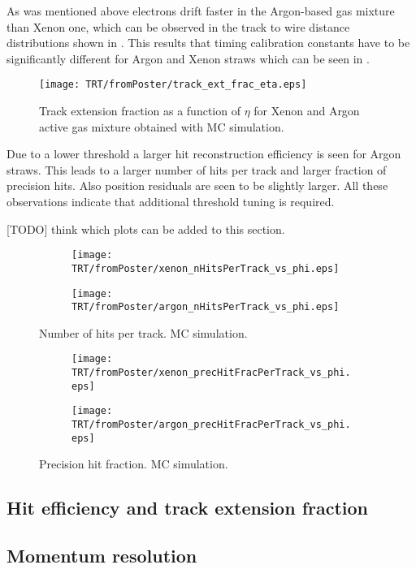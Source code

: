 As was mentioned above electrons drift faster in the Argon-based gas mixture than Xenon one, which can be observed in the track to wire distance
distributions shown in . 
This results that timing calibration constants have to be significantly different 
for Argon and Xenon straws which can be seen in . 


\begin{figure}
\begin{center}
 \texttt{[image: TRT/fromPoster/track\_ext\_frac\_eta.eps]}
\caption{Track extension fraction as a function of $\eta$ for Xenon and Argon active gas mixture obtained with MC simulation.}
\label{fig:meanFreePath}
\end{center}
\end{figure}



Due to a lower threshold a larger hit reconstruction efficiency is seen for Argon straws. This leads to a
larger number of hits per track and larger fraction of precision hits. Also position residuals are seen to be 
slightly larger. All these observations indicate that additional threshold tuning is required.

[TODO] think which plots can be added to this section.

\begin{figure}

\begin{subfigure}{.5\textwidth}
  \centering
  \texttt{[image: TRT/fromPoster/xenon\_nHitsPerTrack\_vs\_phi.eps]}
\end{subfigure}%
\begin{subfigure}{.5\textwidth}
  \centering
  \texttt{[image: TRT/fromPoster/argon\_nHitsPerTrack\_vs\_phi.eps]}
\end{subfigure}

\caption{Number of hits per track. MC simulation.}
  \label{fig:nPrecHitsPerTrack}
\end{figure}


\begin{figure}

\begin{subfigure}{.5\textwidth}
  \centering
  \texttt{[image: TRT/fromPoster/xenon\_precHitFracPerTrack\_vs\_phi.eps]}
\end{subfigure}%
\begin{subfigure}{.5\textwidth}
  \centering
  \texttt{[image: TRT/fromPoster/argon\_precHitFracPerTrack\_vs\_phi.eps]}
\end{subfigure}

\caption{Precision hit fraction. MC simulation.}
  \label{fig:precHitFracPerTrack}
\end{figure}

\subsection{Hit efficiency and track extension fraction}

\subsection{Momentum resolution}



